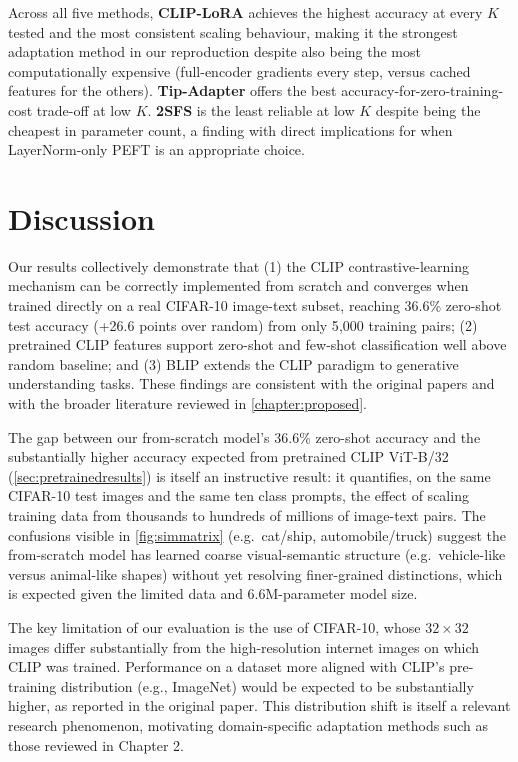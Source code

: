 \documentclass{iutbscthesis}
\begin{document}
Across all five methods, \textbf{CLIP-LoRA} achieves the highest accuracy at every $K$ tested and the most consistent scaling behaviour, making it the strongest adaptation method in our reproduction despite also being the most computationally expensive (full-encoder gradients every step, versus cached features for the others). \textbf{Tip-Adapter} offers the best accuracy-for-zero-training-cost trade-off at low $K$. \textbf{2SFS} is the least reliable at low $K$ despite being the cheapest in parameter count, a finding with direct implications for when LayerNorm-only PEFT is an appropriate choice.

\section{Discussion}

Our results collectively demonstrate that (1) the CLIP contrastive-learning mechanism can be correctly implemented from scratch and converges when trained directly on a real CIFAR-10 image-text subset, reaching 36.6\% zero-shot test accuracy (+26.6 points over random) from only 5{,}000 training pairs; (2) pretrained CLIP features support zero-shot and few-shot classification well above random baseline; and (3) BLIP extends the CLIP paradigm to generative understanding tasks. These findings are consistent with the original papers and with the broader literature reviewed in \autoref{chapter:proposed}.

The gap between our from-scratch model's 36.6\% zero-shot accuracy and the substantially higher accuracy expected from pretrained CLIP ViT-B/32 (\autoref{sec:pretrainedresults}) is itself an instructive result: it quantifies, on the same CIFAR-10 test images and the same ten class prompts, the effect of scaling training data from thousands to hundreds of millions of image-text pairs. The confusions visible in \autoref{fig:simmatrix} (e.g.\ cat/ship, automobile/truck) suggest the from-scratch model has learned coarse visual-semantic structure (e.g.\ vehicle-like versus animal-like shapes) without yet resolving finer-grained distinctions, which is expected given the limited data and 6.6M-parameter model size.

The key limitation of our evaluation is the use of CIFAR-10, whose $32 \times 32$ images differ substantially from the high-resolution internet images on which CLIP was trained. Performance on a dataset more aligned with CLIP's pre-training distribution (e.g., ImageNet) would be expected to be substantially higher, as reported in the original paper. This distribution shift is itself a relevant research phenomenon, motivating domain-specific adaptation methods such as those reviewed in Chapter 2.
\end{document}
